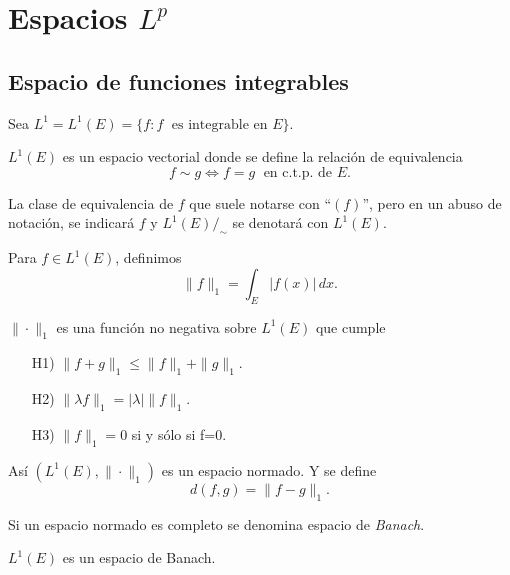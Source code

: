 \chapter{Espacios $L^p$}

\section{Espacio de funciones integrables}
Sea
$
L^1=L^1(E)=
\{
f: f \; \mbox{ es integrable en } E
\}.
$

$L^1(E)$ es un espacio vectorial donde se define la relaci\'on de equivalencia
\[
f \sim g \Longleftrightarrow f=g \;\mbox{ en c.t.p. de } E.
\]   

 
La clase de equivalencia de $f$  que suele notarse con ``$(f)$'', pero en un abuso de notaci\'on, se indicar\'a  $f$
y $L^1(E)/_{\sim}$ se denotar\'a con $L^1(E)$.

Para $f\in L^1(E)$, definimos
\[
\|f\|_1=\int_E|f(x)|\,dx.
\]

$\| \cdot \|_1$ es una funci\'on no negativa sobre $L^1(E)$ que cumple
\begin{enumerate}
    \item [H1)] $\|f+g\|_1\leq \|f\|_1+\|g\|_1$.
    \item [H2)] $\|\lambda f\|_1=|\lambda|\|f\|_1$.
    \item [H3)] $\|f\|_1=0$ si y s\'olo si f=0.
\end{enumerate}

As\'i $(L^1(E),\|\cdot\|_1)$ es un espacio normado. 
Y se define 
\[
d(f,g)=\|f-g\|_1.
\]

Si un espacio normado es completo se denomina espacio de \emph{Banach}. 

\begin{teorema}{}\label{teorema:L1-completo}
$L^1(E)$ es un espacio de Banach.
\end{teorema}

